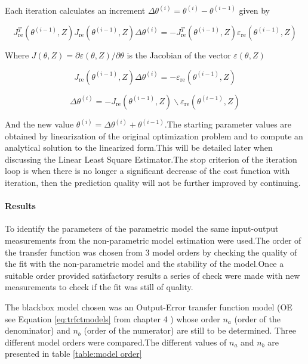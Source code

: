 \documentclass[a4paper,12pt]{article}
\numberwithin{equation}{section}
\begin{document}
Each iteration calculates an increment $\Delta \theta^{(i)}=\theta^{(i)}-\theta^{(i-1)}$ given by 

$$
J_{\mathrm{re}}^{T}\left(\theta^{(i-1)}, Z\right) J_{\mathrm{re}}\left(\theta^{(i-1)}, Z\right) \Delta \theta^{(i)}=-J_{\mathrm{re}}^{T}\left(\theta^{(i-1)}, Z\right) \varepsilon_{\mathrm{re}}\left(\theta^{(i-1)}, Z\right)
$$

Where $J(\theta, Z)=\partial \varepsilon(\theta, Z) / \partial \theta$ is the Jacobian of the vector $\varepsilon(\theta, Z)$

$$
J_{\mathrm{re}}\left(\theta^{(i-1)}, Z\right) \Delta \theta^{(i)}=-\varepsilon_{\mathrm{re}}\left(\theta^{(i-1)}, Z\right)
$$

\begin{equation}\label{eq;thethaMl}
\Delta \theta^{(i)}=-J_{\mathrm{re}}\left(\theta^{(i-1)}, Z\right) \backslash \varepsilon_{\mathrm{re}}\left(\theta^{(i-1)}, Z\right)
\end{equation}


\noindent
And the new value $\theta^{(i)}=\Delta \theta^{(i)} + \theta^{(i-1)} $.The starting parameter values are obtained by linearization of the original optimization problem and to compute an analytical solution to the linearized form.This will be detailed later when discussing the Linear Least Square Estimator.The stop criterion of the iteration loop is when there is no longer a significant decrease of the cost function with iteration, then the prediction quality will not be further improved by continuing.

\paragraph{Results}
To identify the parameters of the parametric model the same input-output measurements from the non-parametric model estimation were used.The order of the transfer function was chosen from 3 model orders  by checking the quality of the fit with the non-parametric model and the stability of the model.Once a suitable order provided satisfactory results a series of check were made with new measurements to check if the fit was still of quality.

The blackbox model chosen was an Output-Error transfer function model (OE see Equation \ref{eq:trfctmodels} from chapter 4 ) whose order $n_{a}$ (order of the denominator)  and $n_{b}$
 (order of the numerator) are still to be determined. Three different model orders
were compared.The different values of  $n_{a}$ and $n_{b}$ are  presented
in table \ref{table:model order}
\end{document}
